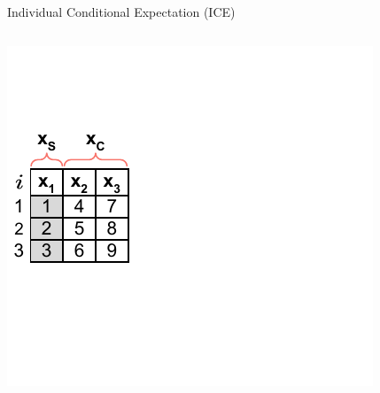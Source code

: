 \documentclass[11pt,compress,t,notes=noshow, xcolor=table]{beamer}
\begin{document}
%
%
%


\begin{vbframe}{Individual Conditional Expectation (ICE)}

\begin{columns}[T]
\begin{column}{0.45\textwidth}
\includegraphics[page=2, trim=0cm 0.35cm 0.85cm 0.35cm, width=\textwidth]{figure_man/ice_plot_demo}
\end{column}
\begin{column}{0.55\textwidth}

\end{column}
\end{columns}
\vspace*{\topsep}


\end{vbframe}
\end{document}
